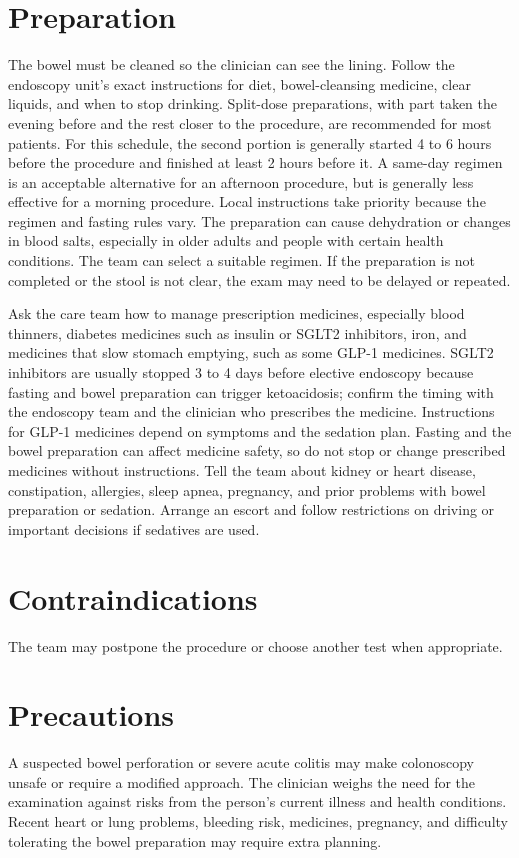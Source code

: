 \section*{Preparation}
The bowel must be cleaned so the clinician can see the lining. Follow the endoscopy unit's exact instructions for diet, bowel-cleansing medicine, clear liquids, and when to stop drinking. Split-dose preparations, with part taken the evening before and the rest closer to the procedure, are recommended for most patients. For this schedule, the second portion is generally started 4 to 6 hours before the procedure and finished at least 2 hours before it. A same-day regimen is an acceptable alternative for an afternoon procedure, but is generally less effective for a morning procedure. Local instructions take priority because the regimen and fasting rules vary. The preparation can cause dehydration or changes in blood salts, especially in older adults and people with certain health conditions. The team can select a suitable regimen. If the preparation is not completed or the stool is not clear, the exam may need to be delayed or repeated.

Ask the care team how to manage prescription medicines, especially blood thinners, diabetes medicines such as insulin or SGLT2 inhibitors, iron, and medicines that slow stomach emptying, such as some GLP-1 medicines. SGLT2 inhibitors are usually stopped 3 to 4 days before elective endoscopy because fasting and bowel preparation can trigger ketoacidosis; confirm the timing with the endoscopy team and the clinician who prescribes the medicine. Instructions for GLP-1 medicines depend on symptoms and the sedation plan. Fasting and the bowel preparation can affect medicine safety, so do not stop or change prescribed medicines without instructions. Tell the team about kidney or heart disease, constipation, allergies, sleep apnea, pregnancy, and prior problems with bowel preparation or sedation. Arrange an escort and follow restrictions on driving or important decisions if sedatives are used.

\section*{Contraindications}
The team may postpone the procedure or choose another test when appropriate.

\section*{Precautions}
A suspected bowel perforation or severe acute colitis may make colonoscopy unsafe or require a modified approach. The clinician weighs the need for the examination against risks from the person's current illness and health conditions. Recent heart or lung problems, bleeding risk, medicines, pregnancy, and difficulty tolerating the bowel preparation may require extra planning.

